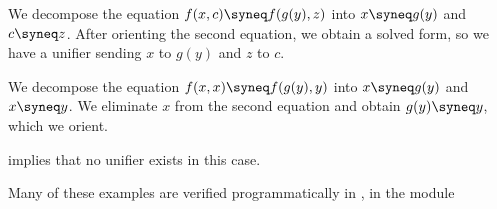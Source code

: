 \begin{example}
\begin{thmenum}
     We decompose the equation \( f(x, c) \syneq f(g(y), z) \) into \( x \syneq g(y) \) and \( c \syneq z \). After orienting the second equation, we obtain a solved form, so we have a unifier sending \( x \) to \( g(y) \) and \( z \) to \( c \).

     We decompose the equation \( f(x, x) \syneq f(g(y), y) \) into \( x \syneq g(y) \) and \( x \syneq y \). We eliminate \( x \) from the second equation and obtain \( g(y) \syneq y \), which we orient.

     implies that no unifier exists in this case.
  \end{thmenum}
\end{example}
\begin{comments}
  \item Many of these examples are verified programmatically in \cite{notebook:code}, in the module
  \begin{CodeRefDisplay}
  \end{CodeRefDisplay}
\end{comments}
